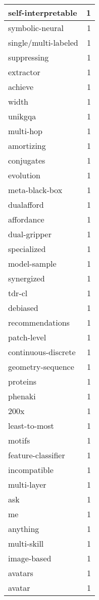 \begin{table}[h]
\begin{tabular}{|l|r|}
\hline
self-interpretable & 1 \\
\hline
symbolic-neural & 1 \\
\hline
single/multi-labeled & 1 \\
\hline
suppressing & 1 \\
\hline
extractor & 1 \\
\hline
achieve & 1 \\
\hline
width & 1 \\
\hline
unikgqa & 1 \\
\hline
multi-hop & 1 \\
\hline
amortizing & 1 \\
\hline
conjugates & 1 \\
\hline
evolution & 1 \\
\hline
meta-black-box & 1 \\
\hline
dualafford & 1 \\
\hline
affordance & 1 \\
\hline
dual-gripper & 1 \\
\hline
specialized & 1 \\
\hline
model-sample & 1 \\
\hline
synergized & 1 \\
\hline
tdr-cl & 1 \\
\hline
debiased & 1 \\
\hline
recommendations & 1 \\
\hline
patch-level & 1 \\
\hline
continuous-discrete & 1 \\
\hline
geometry-sequence & 1 \\
\hline
proteins & 1 \\
\hline
phenaki & 1 \\
\hline
200x & 1 \\
\hline
least-to-most & 1 \\
\hline
motifs & 1 \\
\hline
feature-classifier & 1 \\
\hline
incompatible & 1 \\
\hline
multi-layer & 1 \\
\hline
ask & 1 \\
\hline
me & 1 \\
\hline
anything & 1 \\
\hline
multi-skill & 1 \\
\hline
image-based & 1 \\
\hline
avatars & 1 \\
\hline
avatar & 1 \\

\end{tabular}
\end{table}
